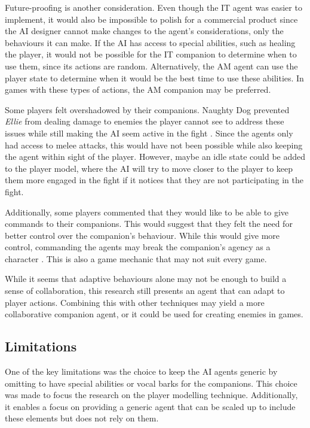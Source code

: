 \documentclass{IEEEtran}
\begin{document}
Future-proofing is another consideration. Even though the IT agent was easier to implement, it would also be impossible to polish for a commercial product since the AI designer cannot make changes to the agent’s considerations, only the behaviours it can make. If the AI has access to special abilities, such as healing the player, it would not be possible for the IT companion to determine when to use them, since its actions are random. Alternatively, the AM agent can use the player state to determine when it would be the best time to use these abilities. In games with these types of actions, the AM companion may be preferred.

Some players felt overshadowed by their companions. Naughty Dog prevented \textit{Ellie} from dealing damage to enemies the player cannot see to address these issues while still making the AI seem active in the fight \cite{GAIP2EllieAI}. Since the agents only had access to melee attacks, this would have not been possible while also keeping the agent within sight of the player. However, maybe an idle state could be added to the player model, where the AI will try to move closer to the player to keep them more engaged in the fight if it notices that they are not participating in the fight.

Additionally, some players commented that they would like to be able to give commands to their companions. This would suggest that they felt the need for better control over the companion's behaviour. While this would give more control, commanding the agents may break the companion's agency as a character \cite{EGXCharacterDeathGuildWars}. This is also a game mechanic that may not suit every game.

While it seems that adaptive behaviours alone may not be enough to build a sense of collaboration, this research still presents an agent that can adapt to player actions. Combining this with other techniques may yield a more collaborative companion agent, or it could be used for creating enemies in games.

\subsection{Limitations}
\label{Limitations}

One of the key limitations was the choice to keep the AI agents generic by omitting to have special abilities or vocal barks for the companions. This choice was made to focus the research on the player modelling technique. Additionally, it enables a focus on providing a generic agent that can be scaled up to include these elements but does not rely on them.
\end{document}
